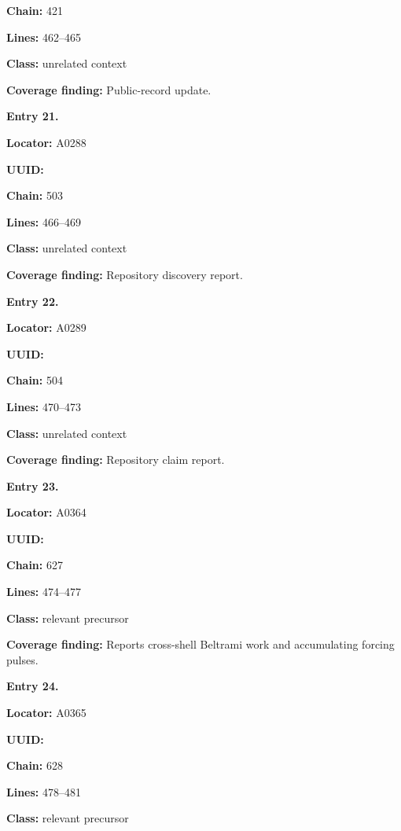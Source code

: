 \textbf{Chain:} 421

\textbf{Lines:} 462--465

\textbf{Class:} unrelated context

\textbf{Coverage finding:} Public-record update.


\textbf{Entry 21.}

\textbf{Locator:} A0288

\textbf{UUID:} \protect{}

\textbf{Chain:} 503

\textbf{Lines:} 466--469

\textbf{Class:} unrelated context

\textbf{Coverage finding:} Repository discovery report.


\textbf{Entry 22.}

\textbf{Locator:} A0289

\textbf{UUID:} \protect{}

\textbf{Chain:} 504

\textbf{Lines:} 470--473

\textbf{Class:} unrelated context

\textbf{Coverage finding:} Repository claim report.


\textbf{Entry 23.}

\textbf{Locator:} A0364

\textbf{UUID:} \protect{}

\textbf{Chain:} 627

\textbf{Lines:} 474--477

\textbf{Class:} relevant precursor

\textbf{Coverage finding:} Reports cross-shell Beltrami work and
accumulating forcing pulses.


\textbf{Entry 24.}

\textbf{Locator:} A0365

\textbf{UUID:} \protect{}

\textbf{Chain:} 628

\textbf{Lines:} 478--481

\textbf{Class:} relevant precursor

